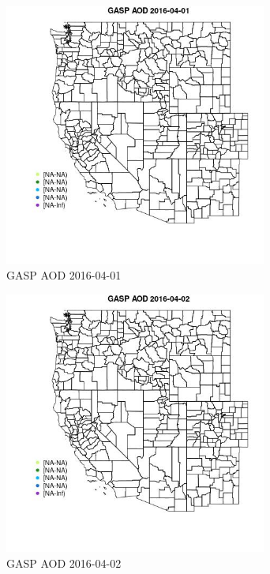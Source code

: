 \begin{figure} 
\centering  
\includegraphics[width=0.77\textwidth]{Code_Outputs/Report_ML_input_PM25_Step4_part_e_de_duplicated_aveswNAs_MapObsGASP_AOD2016-04-01.jpg} 
\caption{\label{fig:Report_ML_input_PM25_Step4_part_e_de_duplicated_aveswNAsMapObsGASP_AOD2016-04-01}GASP AOD 2016-04-01} 
\end{figure} 
 

\begin{figure} 
\centering  
\includegraphics[width=0.77\textwidth]{Code_Outputs/Report_ML_input_PM25_Step4_part_e_de_duplicated_aveswNAs_MapObsGASP_AOD2016-04-02.jpg} 
\caption{\label{fig:Report_ML_input_PM25_Step4_part_e_de_duplicated_aveswNAsMapObsGASP_AOD2016-04-02}GASP AOD 2016-04-02} 
\end{figure} 
 

